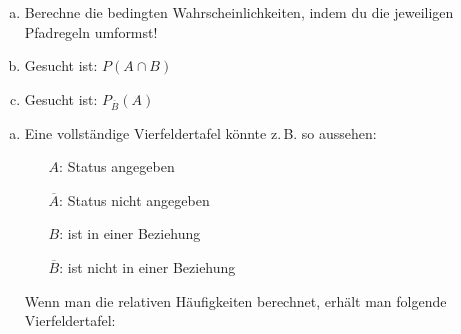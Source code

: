 \begin{exercise}
\begin{enumerate}[a)]
\begin{center}
\begin{fourfoldtable}
              \end{fourfoldtable}
            \end{center}
      \item Berechne die bedingten Wahrscheinlichkeiten, indem du die
            jeweiligen Pfadregeln umformst!
      \item Gesucht ist: $P(A\cap B)$
      \item Gesucht ist: $P_{\overline{B}}(A)$
    \end{enumerate}
  \fi
  \ifoutcome\outcome
    \begin{enumerate}[a)]
      \item Eine vollständige Vierfeldertafel könnte z.\,B. so aussehen:
            \begin{center}
              \begin{minipage}{0.36\linewidth}
                \begin{itemize}
                  \setlength{\leftskip}{0pt}%
                  \setlength{\itemsep}{-0.1\baselineskip}%
                  \item[$A$:]            Status angegeben
                  \item[$\overline{A}$:] Status nicht angegeben
                  \item[$B$:]            ist in einer Beziehung
                  \item[$\overline{B}$:] ist nicht in einer Beziehung
                \end{itemize}
              \end{minipage}
              \qquad
              \begin{fourfoldtable}
              \end{fourfoldtable}
            \end{center}
             Wenn man die relativen Häufigkeiten berechnet, erhält man
             folgende Vierfeldertafel:
             \begin{center}
               \begin{fourfoldtable}

\end{fourfoldtable}
\end{center}
\end{enumerate}
\end{exercise}
